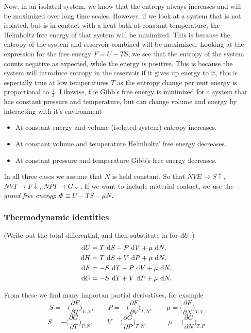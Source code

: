 \documentclass[a4paper, 11pt, notitlepage, english]{article}
\renewcommand{\d}{{\rm d}}
\newcommand{\p}{\partial}
\begin{document}
Now, in an isolated system, we know that the entropy always increases and will be maximized over long time scales. However, if we look at a system that is not isolated, but is in contact with a heat bath at constant temperature, the Helmholtz free energy of that system will be minimized. This is because the entropy of the system and reservoir combined will be maximized. Looking at the expression for the free energy $F = U - TS$, we see that the entropy of the system counts negative as expected, while the energy is positive. This is because the system will introduce entropy in the reservoir if it gives up energy to it, this is especially true at low temperatures $T$ as the entropy change per unit energy is proportional to $\frac{1}{T}$. Likewise, the Gibb's free energy is minimized for a system that has constant pressure and temperature, but can change volume and energy by interacting with it's environment
\begin{itemize}
	\item At constant energy and volume (isolated system) entropy increases.
	\item At constant volume and temperature Helmholtz' free energy decreases.
	\item At constant pressure and temperature Gibb's free energy decreases.
\end{itemize}
In all three cases we assume that $N$ is held constant. So that $NVE \to S\uparrow$, $NVT \to F\downarrow$, $NPT\to G\downarrow$. If we want to include material contact, we use the \emph{grand free energy}: $\Phi \equiv U - TS - \mu N$.

\newpage

\subsubsection*{Thermodynamic identities}
(Write out the total differential, and then substitute in for $\d U$.)
\begin{align*}
\d U &= T\ \d S - P \ \d V + \mu \ \d N, \\
\d H &= T \ \d S + V\ \d P + \mu \ \d N, \\
\d F &=  - S \ \d T - P \ \d V + \mu \ \d N, \\
\d G &= -S \ \d T + V\ \d P + \mu \ \d N.
\end{align*}

From these we find many importan partial derivatives, for example
$$S = -\bigg(\frac{\p F}{\p T}\bigg)_{V, N}, \qquad P = -\bigg(\frac{\p F}{\p V}\bigg)_{T, N}, \qquad \mu = \bigg(\frac{\p F}{\p N}\bigg)_{T,V}$$
$$S = -\bigg(\frac{\p G}{\p T}\bigg)_{P, N}, \qquad V = \bigg(\frac{\p G}{\p P}\bigg)_{T, N}, \qquad\quad \mu = \bigg(\frac{\p G}{\p N}\bigg)_{T,P}$$
\end{document}
